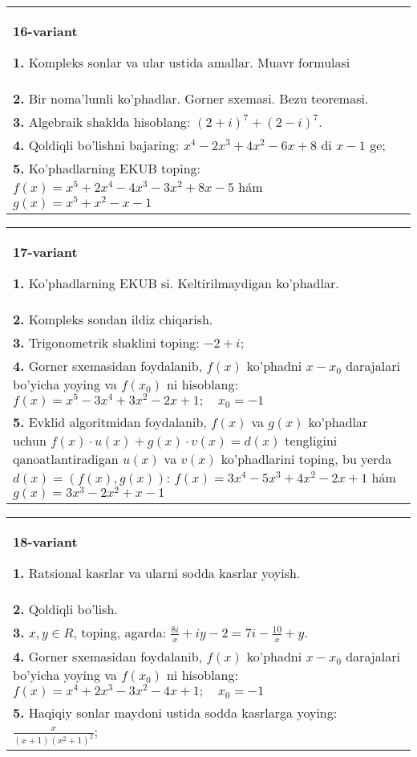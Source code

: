 \documentclass{article}
\begin{document}
\begin{tabular}{m{17cm}}
\textbf{16-variant}
\newline

\textbf{1.} Kompleks sonlar va ular ustida amallar. Muavr formulasi  \\
\textbf{2.} Bir noma’lumli ko’phadlar. Gorner sxemasi. Bezu teoremasi.  \\
\textbf{3.} Algebraik shaklda hisoblang: $(2+i)^7+(2-i)^7$. \\
\textbf{4.} Qoldiqli bo’lishni bajaring: $x^4-2 x^3+4 x^2-6 x+8$ di $x-1$ ge; \\
\textbf{5.} Ko’phadlarning EKUB toping:  $f(x)=x^5+2 x^4-4 x^3-3 x^2+8 x-5$ hám $g(x)=x^5+x^2-x-1$ \\

\end{tabular}
\vspace{1cm}


\begin{tabular}{m{17cm}}
\textbf{17-variant}
\newline

\textbf{1.} Ko’phadlarning EKUB si. Keltirilmaydigan ko’phadlar. \\
\textbf{2.} Kompleks sondan ildiz chiqarish. \\
\textbf{3.} Trigonometrik shaklini toping: $-2+i$; \\
\textbf{4.} Gorner sxemasidan foydalanib, $f(x)$ ko’phadni $x-x_0$ darajalari bo’yicha yoying va $f\left(x_0\right)$ ni hisoblang: $f(x)=x^5-3 x^4+3 x^2-2 x+1 ; \quad x_0=-1$ \\
\textbf{5.} Evklid algoritmidan foydalanib, $f(x)$ va $g(x)$ ko’phadlar uchun $f(x) \cdot u(x)+g(x) \cdot v(x)=d(x)$ tengligini qanoatlantiradigan $u(x)$ va $v(x)$ ko’phadlarini toping, bu yerda $d(x)=(f(x), g(x))$:  $f(x)=3 x^4-5 x^3+4 x^2-2 x+1$ hám $g(x)=3 x^3-2 x^2+x-1$ \\

\end{tabular}
\vspace{1cm}


\begin{tabular}{m{17cm}}
\textbf{18-variant}
\newline

\textbf{1.} Ratsional kasrlar va ularni sodda kasrlar yoyish. \\
\textbf{2.} Qoldiqli bo’lish.  \\
\textbf{3.} $x, y \in R$, toping, agarda:  $\frac{8 i}{x}+i y-2=7 i-\frac{10}{x}+y$. \\
\textbf{4.} Gorner sxemasidan foydalanib, $f(x)$ ko’phadni $x-x_0$ darajalari bo’yicha yoying va $f\left(x_0\right)$ ni hisoblang: $f(x)=x^4+2 x^3-3 x^2-4 x+1 ; \quad x_0=-1$ \\
\textbf{5.} Haqiqiy sonlar maydoni ustida sodda kasrlarga yoying:  $\frac{x}{(x+1)\left(x^2+1\right)^2}$; \\

\end{tabular}
\vspace{1cm}
\end{document}
